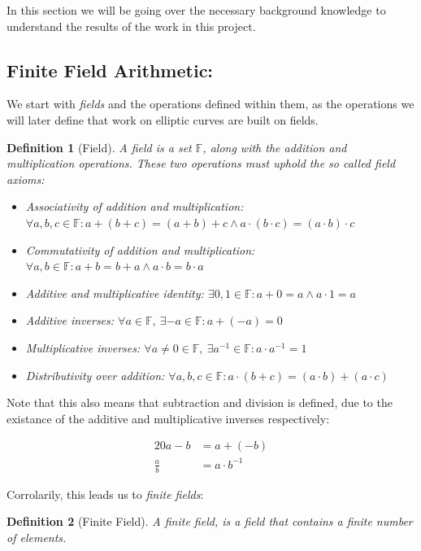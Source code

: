 \documentclass{article}
\newtheorem{definition}{Definition}[section]
\newcommand{\eq}[1]{\begin{alignat*}{20}#1\end{alignat*}}
\newcommand{\F}{\mathbb{F}}
\begin{document}
In this section we will be going over the necessary background knowledge
to understand the results of the work in this project.

\subsection{Finite Field Arithmetic:} \label{Finite Field Arithmetic}

We start with \textit{fields} and the operations defined within
them, as the operations we will later define that work on elliptic
curves are built on fields.

\begin{definition}[Field]
	A field is a set $\F$, along with the \textit{addition} and
	\textit{multiplication} operations. These two operations must
	uphold the so called \textit{field axioms}:

	\begin{itemize}
		\item Associativity of addition and multiplication:
		$\forall a,b,c \in \F : a + (b + c) = (a + b) + c \land a \cdot (b \cdot c) = (a \cdot b) \cdot c$
		\item Commutativity of addition and multiplication:
		$\forall a,b \in \F : a+b=b+a \land a \cdot b = b \cdot a$
		\item Additive and multiplicative identity:
		$\exists 0,1 \in \F : a + 0 = a \land a \cdot 1 = a$
		\item Additive inverses:
		$\forall a \in \F,\ \exists {-a} \in \F : a + ({-a}) = 0$
		\item Multiplicative inverses:
		$\forall a \neq 0 \in \F,\  \exists a^{-1} \in \F : a \cdot a^{-1} = 1$
		\item Distributivity over addition:
		$\forall a,b,c \in \F : a \cdot (b + c) = (a \cdot b) + (a \cdot c)$
	\end{itemize}
\end{definition}

Note that this also means that subtraction and division is defined,
due to the existance of the additive and multiplicative inverses
respectively:

\eq{
	a-b         &= a + (-b) \\
	\frac{a}{b} &= a \cdot b^{-1}
}

Corrolarily, this leads us to \textit{finite fields}:

\begin{definition}[Finite Field]
	A finite field, is a field that contains a finite number of elements.
\end{definition}
\end{document}
